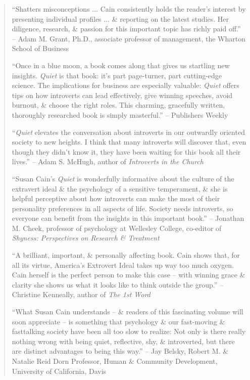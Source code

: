 \documentclass{article}
\numberwithin{equation}{section}
\begin{document}
\begin{quotation}
	``Shatters misconceptions $\ldots$ Cain consistently holds the reader's interest by presenting individual profiles $\ldots$ \& reporting on the latest studies. Her diligence, research, \& passion for this important topic has richly paid off.'' -- Adam M. Grant, Ph.D., associate professor of management, the Wharton School of Business
	
	``Once in a blue moon, a book comes along that gives us startling new insights. \textit{Quiet} is that book: it's part page-turner, part cutting-edge science. The implications for business are especially valuable: \textit{Quiet} offers tips on how introverts can lead effectively, give winning speeches, avoid burnout, \& choose the right roles. This charming, gracefully written, thoroughly researched book is simply masterful.'' -- Publishers Weekly
	
	``\textit{Quiet} elevates the conversation about introverts in our outwardly oriented society to new heights. I think that many introverts will discover that, even though they didn't know it, they have been waiting for this book all their lives.'' -- Adam S. McHugh, author of \textit{Introverts in the Church}
	
	``Susan Cain's \textit{Quiet} is wonderfully informative about the culture of the extravert ideal \& the psychology of a sensitive temperament, \& she is helpful perceptive about how introverts can make the most of their personality preferences in all aspects of life. Society needs introverts, so everyone can benefit from the insights in this important book.'' -- Jonathan M. Cheek, professor of psychology at Wellesley College, co-editor of \textit{Shyness: Perspectives on Research \& Treatment}
	
	``A brilliant, important, \& personally affecting book. Cain shows that, for all its virtue, America's Extrovert Ideal takes up way too much oxygen. Cain herself is the perfect person to make this case -- with winning grace \& clarity she shows us what it looks like to think outside the group.'' -- Christine Kenneally, author of \textit{The 1st Word}
	
	``What Susan Cain understands -- \& readers of this fascinating volume will soon appreciate -- is something that psychology \& our fast-moving \& fasttalking society have been all too slow to realize: Not only is there really nothing wrong with being quiet, reflective, shy, \& introverted, but there are distinct advantages to being this way.'' -- Jay Belsky, Robert M. \& Natalie Reid Dorn Professor, Human \& Community Development, University of California, Davis
	

\end{quotation}
\end{document}
